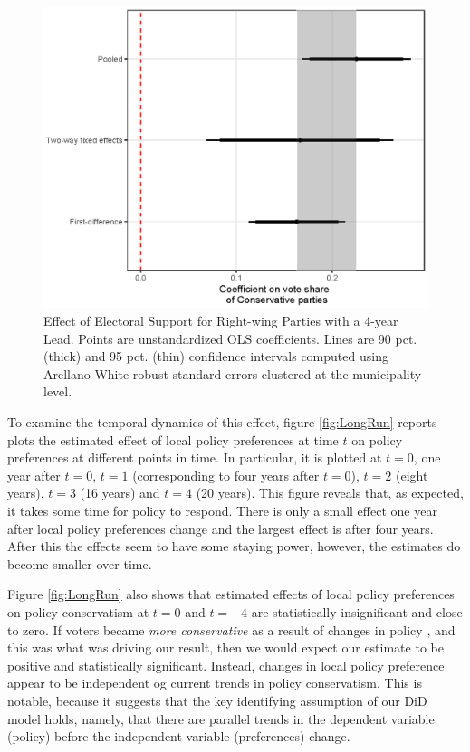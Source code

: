 \documentclass[a4paper,12pt]{article}
\begin{document}
\begin{figure}[h]
	\centering
	\includegraphics[scale = 0.8]{Newest_ggplot_coef.eps}
	\caption{Effect of Electoral Support for Right-wing Parties with a 4-year Lead. Points are unstandardized OLS coefficients. Lines are 90 pct. (thick) and 95 pct. (thin) confidence intervals computed using Arellano-White robust standard errors clustered at the municipality level.}
	\label{fig:FourYearLead}
\end{figure}


To examine the temporal dynamics of this effect, figure \ref{fig:LongRun} reports plots the estimated effect of local policy preferences at time $t$ on policy preferences at different points in time. In particular, it is plotted at $t=0$, one year after $t=0$, $t=1$ (corresponding to four years after $t=0$), $t=2$ (eight years), $t=3$ (16 years) and $t=4$ (20 years). This figure reveals that, as expected, it takes some time for policy to respond. There is only a small effect one year after local policy preferences change and the largest effect is  after four years. After this the effects seem to have some staying power, however, the estimates do become smaller over time.

Figure \ref{fig:LongRun} also shows that estimated effects of local policy preferences on policy conservatism at $t=0$ and $t=-4$ are statistically insignificant and close to zero. If voters became \emph{more conservative} as a result of changes in policy \cite[cf.][]{lenz2013follow,slothuus2010can}, and this was what was driving our result, then we would expect our estimate to be positive and statistically significant. Instead, changes in local policy preference appear to be independent og current trends in policy conservatism. This is notable, because it suggests that the key identifying assumption of our DiD model holds, namely, that there are parallel trends in the dependent variable (policy) before the independent variable (preferences) change.
\end{document}
